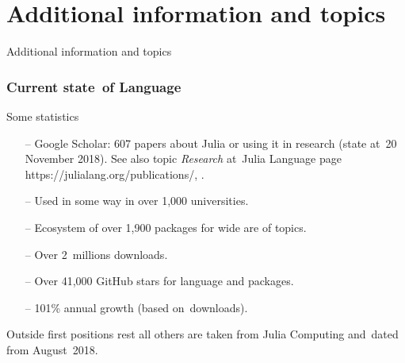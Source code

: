 \documentclass{beamer}  %
\begin{document}
\section[]{Additional information and topics}





\begin{frame}

  \begin{center}
    \LARGE Additional information and topics
  \end{center}

\end{frame}





\begin{frame}
  \frametitle{Current state~of Language}

  \begin{block}{Some statistics}
    \begin{itemize}
    \item[--] Google Scholar: 607 papers about Julia or using it in
      research (state at~20 November 2018). See also topic
      \emph{Research} at~Julia Language page
      https://julialang.org/publications/,
      .
    \item[--] Used in some way in over 1,000 universities.
    \item[--] Ecosystem of over 1,900 packages for wide are of topics.
    \item[--] Over 2~millions downloads.
    \item[--] Over 41,000 GitHub stars for language and packages.
    \item[--] 101\% annual growth (based on~downloads).
    \end{itemize}
    Outside first positions rest all others are taken from Julia
    Computing and~dated from August~2018.
  \end{block}

\end{frame}
\end{document}
